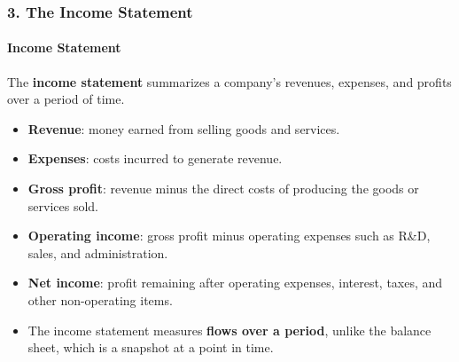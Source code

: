 \documentclass{beamer}
\begin{document}
\begin{frame}[t]
    \frametitle{3. The Income Statement}
    \framesubtitle{Income Statement}

    The \textbf{income statement} summarizes a company's revenues,
    expenses, and profits over a period of time.

    \vspace{1em}

    \begin{itemize}
        \item \textbf{Revenue}: money earned from selling goods and services.

        \item \textbf{Expenses}: costs incurred to generate revenue.

        \item \textbf{Gross profit}: revenue minus the direct costs of
        producing the goods or services sold.

        \item \textbf{Operating income}: gross profit minus operating
        expenses such as R\&D, sales, and administration.

        \item \textbf{Net income}: profit remaining after operating expenses,
        interest, taxes, and other non-operating items.

        \item The income statement measures \textbf{flows over a period},
        unlike the balance sheet, which is a snapshot at a point in time.
    \end{itemize}

\end{frame}
\end{document}
